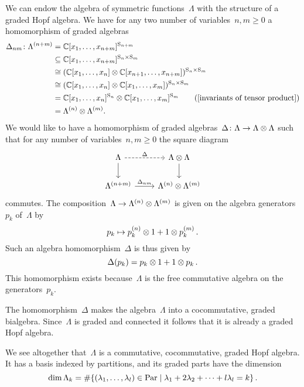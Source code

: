\documentclass[a4paper, 11pt, twoside=semi]{scrartcl}
\begin{document}
We can endow the algebra of symmetric functions~$\Lambda$ with the structure of a graded Hopf algebra.
We have for any two number of variables~$n, m \geq 0$ a homomorphism of graded algebras
\begin{align*}
  \Delta_{nm}
  \colon
  \Lambda^{(n+m)}
  &=
  \Complex[x_1, \dotsc, x_{n+m}]^{\symm_{n+m}}
  \\
  &\subseteq
  \Complex[x_1, \dotsc, x_{n+m}]^{\symm_n \times \symm_m}
  \\
  &\cong
  ( \Complex[x_1, \dotsc, x_n] \tensor \Complex[x_{n+1}, \dotsc, x_{n+m}] )^{\symm_n \times \symm_m}
  \\
  &\cong
  ( \Complex[x_1, \dotsc, x_n] \tensor \Complex[x_1, \dotsc, x_m] )^{\symm_n \times \symm_m}
  \\
  &=
  \Complex[x_1, \dotsc, x_n]^{\symm_n} \tensor \Complex[x_1, \dotsc, x_m]^{\symm_m}
  \tag{\cref{invariants of tensor product}}
  \\
  &=
  \Lambda^{(n)} \tensor \Lambda^{(m)}.
\end{align*}
We would like to have a homomorphism of graded algebras~$\Delta \colon \Lambda \to \Lambda \otimes \Lambda$ such that for any number of variables~$n, m \geq 0$ the square diagram
\[
  \begin{tikzcd}
    \Lambda
    \arrow[dashed]{r}[above]{\Delta}
    \arrow{d}
    &
    \Lambda \tensor \Lambda
    \arrow{d}
    \\
    \Lambda^{(n+m)}
    \arrow{r}[above]{\Delta_{nm}}
    &
    \Lambda^{(n)} \tensor \Lambda^{(m)}
  \end{tikzcd}
\]
commutes.
The composition~$\Lambda \to \Lambda^{(n)} \otimes \Lambda^{(m)}$ is given on the algebra generators~$p_k$ of~$\Lambda$ by
\[
  p_k \mapsto p^{(n)}_k \otimes 1 + 1 \otimes p^{(m)}_k \,.
\]
Such an algebra homomorphism~$\Delta$ is thus given by
\[
  \Delta(p_k) = p_k \otimes 1 + 1 \otimes p_k \,.  
\]
This homomorphism exists because~$\Lambda$ is the free commutative algebra on the generators~$p_k$.

The homomorphism~$\Delta$ makes the algebra~$\Lambda$ into a cocommutative, graded bialgebra.
Since~$\Lambda$ is graded and connected it follows that it is already a graded Hopf algebra.

We see altogether that~$\Lambda$ is a commutative, cocommutative, graded Hopf algebra.
It has a basis indexed by partitions, and its graded parts have the dimension
\[
  \dim \Lambda_k
  =
  \counting
  \{
    (\lambda_1, \dotsc, \lambda_l) \in \Par
  \suchthat
    \lambda_1 + 2 \lambda_2 + \dotsb + l \lambda_l
    =
    k
  \} \,.
\]
\end{document}
